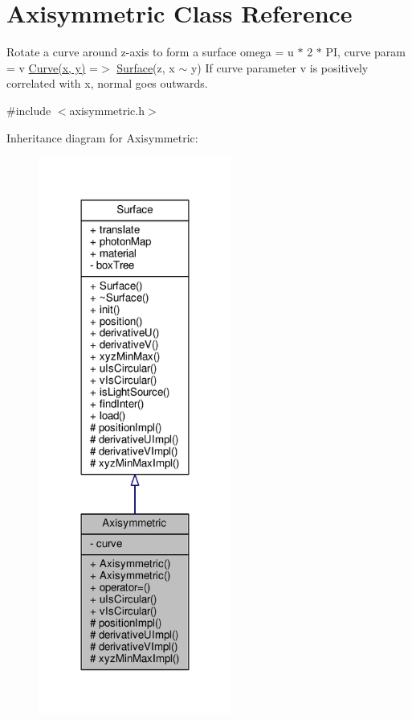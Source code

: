 \hypertarget{classAxisymmetric}{}\section{Axisymmetric Class Reference}
\label{classAxisymmetric}


Rotate a curve around z-\/axis to form a surface omega = u $\ast$ 2 $\ast$ PI, curve param = v \hyperlink{classCurve}{Curve(x, y)} =$>$ \hyperlink{classSurface}{Surface}(z, x $\sim$ y) If curve parameter v is positively correlated with x, normal goes outwards.  




{\ttfamily \#include $<$axisymmetric.\+h$>$}



Inheritance diagram for Axisymmetric\+:
\nopagebreak
\begin{figure}[H]
\begin{center}
\leavevmode
\includegraphics[width=180pt]{classAxisymmetric__inherit__graph}
\end{center}
\end{figure}


